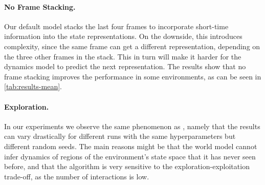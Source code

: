 \documentclass{article}
\begin{document}
\paragraph{No Frame Stacking.} Our default model stacks the last four
frames to incorporate short-time information into the state
representations. On the downside, this introduces complexity, since the
same frame can get a different representation, depending on the three
other frames in the stack. This in turn will make it harder for the
dynamics model to predict the next representation. The results show that no
frame stacking improves the performance in some environments, as can be seen in
\cref{tab:results-mean}.

\paragraph{Exploration.}
In our experiments we observe the same phenomenon as \citet{simple}, namely that
the results can vary drastically for different runs with the same
hyperparameters but different random seeds. The main reasons might be that
the world model cannot infer dynamics of regions of the environment's state
space that it has never seen before, and that the algorithm is very sensitive to
the exploration-exploitation trade-off, as the number of interactions is low.

\clearpage
\end{document}
